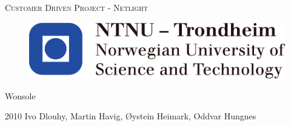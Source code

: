 \documentclass[10pt,a4paper,oneside]{report}
\begin{document}


	\thispagestyle{empty}
	\begin{center}
		\Huge\textsc{Customer Driven Project - Netlight}\\
\begin{figure}
\centering
\includegraphics{image/logo-ntnu.pdf}
\end{figure}
		Wonsole\\
	\end{center}
	{\LARGE 2010 \hfill Ivo Dlouhy, Martin Havig, Øystein Heimark, Oddvar Hungnes}
	\newpage




\begin{abstract}

Imagine the old minimachine systems where the end user works in a domain specific application in a black-and-green terminal. She is super efficient, jumping between windows with short cuts and everything is "in her fingers".
 
This is then replaced with a web-frontend and a mouse. Everything is "wrong", the design makes the usage patterns locked and she gets "mouse sickness" from point-clicking every command.
 
The task is to modify a web-application and add a scripting-console where the end-user can enter commands into a DSL - similar to the older interface. When commands are run, the results are shown both in the console and the web-interface. The use can still use the mouse and navigate as usual.
 
The target is a simple proof-of-concept in order to research any changes to the API, the potential of the method as well as evaluate the usability of scripting languages/DSL and API.



\end{abstract}
\end{document}
